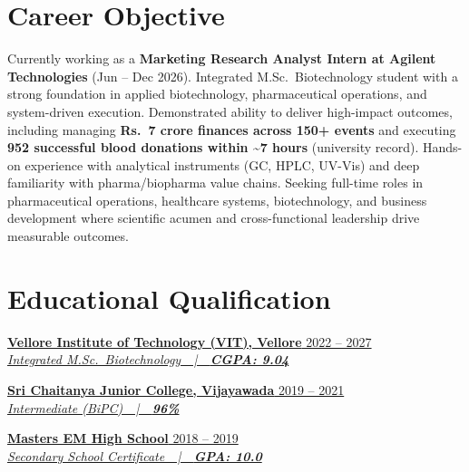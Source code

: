 \documentclass[10pt, a4paper]{article}
\newcommand{\instentry}[3]{%
  \textbf{#1} \hfill #2 \\
  \textit{#3}%
}
\begin{document}
\section{Career Objective}

Currently working as a \textbf{Marketing Research Analyst Intern at Agilent Technologies} (Jun -- Dec 2026). Integrated M.Sc.\ Biotechnology student with a strong foundation in applied biotechnology, pharmaceutical operations, and system-driven execution. Demonstrated ability to deliver high-impact outcomes, including managing \textbf{Rs.\ 7 crore finances across 150+ events} and executing \textbf{952 successful blood donations within \textasciitilde7 hours} (university record). Hands-on experience with analytical instruments (GC, HPLC, UV-Vis) and deep familiarity with pharma/biopharma value chains. Seeking full-time roles in pharmaceutical operations, healthcare systems, biotechnology, and business development where scientific acumen and cross-functional leadership drive measurable outcomes.

\vspace{2pt}

\section{Educational Qualification}

\href{https://drive.google.com/file/d/1MURK8z4sF1ZxJLiPiarqxK-zR6nW8Rob/view?usp=sharing}{\instentry{Vellore Institute of Technology (VIT), Vellore}%
  {2022 -- 2027}%
  {Integrated M.Sc.\ Biotechnology\ \ |\ \ \textbf{CGPA: 9.04}}}

\vspace{5pt}

\href{https://drive.google.com/file/d/13R-O5OhHZeRIpjm2o4nyuUF3UBJJaFrc/view?usp=sharing}{\instentry{Sri Chaitanya Junior College, Vijayawada}%
  {2019 -- 2021}%
  {Intermediate (BiPC)\ \ |\ \ \textbf{96\%}}}

\vspace{5pt}

\href{https://drive.google.com/file/d/13KkqJNk7TV_GUvXSlcIHSze3GFGcqrEO/view?usp=sharing}{\instentry{Masters EM High School}%
  {2018 -- 2019}%
  {Secondary School Certificate\ \ |\ \ \textbf{GPA: 10.0}}}
\end{document}
